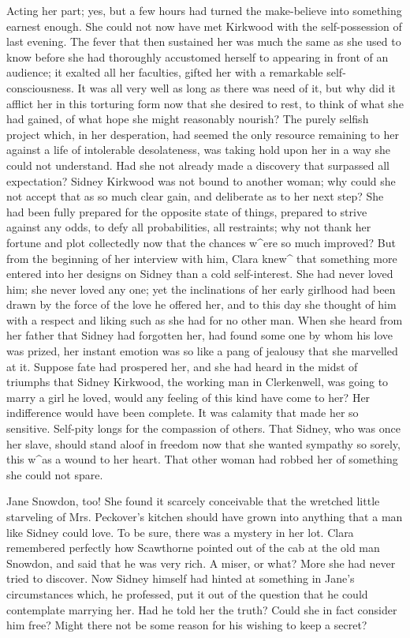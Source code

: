 Acting her part; yes, but a few hours had turned the make-believe into
something earnest enough. She could not now have met Kirkwood with the
self-possession of last evening. The fever that then sustained her was
much the same as she used to know before she had thoroughly accustomed
herself to appearing in front of an audience; it exalted all her
faculties, gifted her with a remarkable self-consciousness. It was all
very well as long as there was need of it, but why did it afflict her in
this torturing form now that she desired to rest, to think of what she
had gained, of what hope she might reasonably nourish? The purely
selfish project which, in her desperation, had seemed the only resource
remaining to her against a life of intolerable desolateness, was taking
hold upon her in a way she could not {\protect\hypertarget{98}{}{}}
understand. Had she not already made a discovery that surpassed all
expectation? Sidney Kirkwood was not bound to another woman; why could
she not accept that as so much clear gain, and deliberate as to her next
step? She had been fully prepared for the opposite state of things,
prepared to strive against any odds, to defy all probabilities, all
restraints; why not thank her fortune and plot collectedly now that the
chances w\^{}ere so much improved? But from the beginning of her
interview with him, Clara knew\^{} that something more entered into her
designs on Sidney than a cold self-interest. She had never loved him;
she never loved any one; yet the inclinations of her early girlhood had
been drawn by the force of the love he offered her, and to this day she
thought of him with a respect and liking such as she had for no other
man. When she heard from her father that Sidney had forgotten her, had
found some one by whom his love was prized, her instant emotion was so
like a pang of jealousy that she marvelled at it. Suppose fate had
prospered her, and she had heard in the midst of triumphs that Sidney
Kirkwood, the working man in Clerkenwell, was going to
{\protect\hypertarget{99}{}{}} marry a girl he loved, would any feeling
of this kind have come to her? Her indifference would have been
complete. It was calamity that made her so sensitive. Self-pity longs
for the compassion of others. That Sidney, who was once her slave,
should stand aloof in freedom now that she wanted sympathy so sorely,
this w\^{}as a wound to her heart. That other woman had robbed her of
something she could not spare.

Jane Snowdon, too! She found it scarcely conceivable that the wretched
little starveling of Mrs. Peckover's kitchen should have grown into
anything that a man like Sidney could love. To be sure, there was a
mystery in her lot. Clara remembered perfectly how Scawthorne pointed
out of the cab at the old man Snowdon, and said that he was very rich. A
miser, or what? More she had never tried to discover. Now Sidney himself
had hinted at something in Jane's circumstances which, he professed, put
it out of the question that he could contemplate marrying her. Had he
told her the truth? Could she in fact consider him free? Might there not
be some reason for his wishing to keep a secret?

